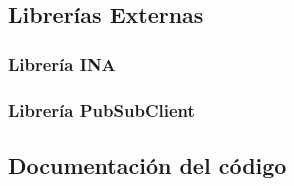 \subsection{Librerías Externas}
\subsubsection{Librería INA}


\subsubsection{Librería PubSubClient}


\subsection{Documentación del código}

